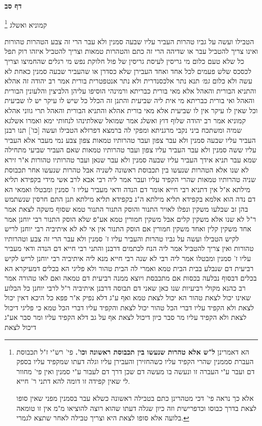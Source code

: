 \documentclass[12pt, openany]{book}
\newcommand{\sethebfont}{
\fontsize{10.5pt}{21.0pt} \selectfont
}
\newcommand{\twocol}[1]{
	{\sethebfont \begin{multicols}{2}
			#1
	\end{multicols}}	
}
\newcommand{\sectname}{}
\newcommand{\newsection}[1]{
	\addcontentsline{toc}{section}{#1}
	\renewcommand{\sectname}{#1}	
	\vspace{-\baselineskip}
	\begin{center}
		\textbf{%
\fontsize{16pt}{16pt}\selectfont
			#1}
	\end{center}
	\vspace{-\baselineskip}
	\nopagebreak
}
\newcommand{\footnotecomment}[1]{\footnote{#1}}
\newcommand{\commenta}[1]{\footnotecomment{#1}}
\begin{document}
\newsection{דף סב}
\twocol{קמוניא ואשלג
\commenta{הא דאמרינן \textbf{ל"ש אלא טהרות שנעשו בין תכבוסת ראשונה וכו'.}  פי' רש"י ז"ל תכבוסת העברת סממנין שהרי הקפיד עליו כשהחזירן והעבירן עליו וגלה דעתו שמקפיד עליו בספק דם ועבר ע"י העברה זו ונעשה בו מעשה דם שכן דרך דם לעבור ע"י סמנין ואין פי' מחוור לי שאין קפידה זו דומה להא דתני ר' חייא.\par  אלא כך נראה פי' דכי מטהרינן כתם בטבילה ראשונה כשלא עבר בסמנין מפני שאין סופו לצאת בדרך כבוסו וכדפרישית וזה כיון שגלה דעתו שהוא רוצה להוציאו מ"מ אין זו טומאה בלועה אלא סופו לצאת היא וצריך טבילה לאחר שתצא לגמרי. }

הטבילו ועשה על גביו טהרות העביר עליו שבעה סמנין ולא עבר הרי זה צבע הטהרות טהורות ואינו צריך להטביל  עבר או שדיהה הרי זה כתם והטהרות טמאות וצריך להטביל 
איזהו רוק תפל כל שלא טעם כלום  מי גריסין לעיסת גריסין של פול חלוקת נפש  מי רגלים שהחמיצו 
וצריך לכסכס שלש פעמים לכל אחד ואחד  העבירן שלא כסדרן או שהעביר שבעה סמנין כאחת לא עשה ולא כלום
{\large\emph{גמ׳}} תנא נתר אלכסנדרית ולא נתר אנטפטרית
בורית אמר רב יהודה  זה אהלא  והתניא  הבורית והאהל  אלא מאי בורית כבריתא 
ורמינהי  הוסיפו עליהן הלביצין והלעונין הבורית והאהל  ואי בורית כבריתא מי אית ליה שביעית  והתנן זה הכלל  כל שיש לו עיקר יש לו שביעית וכל שאין לו עיקר אין לו שביעית  אלא מאי בורית אהלא  והתניא  הבורית והאהל  תרי גווני אהלא
קמוניא אמר רב יהודה  שלוף דוץ ואשלג אמר שמואל  שאלתינהו לנחותי ימא ואמרו  אשלגא שמיה ומשתכח ביני נקבי מרגניתא ומפקי לה ברמצא דפרזלא
הטבילו ועשה [כו'] תנו רבנן  העביר עליו שבעה סמנין ולא עבר  צפון ועבר טהרותיו טמאות 
צפון צבע נמי מעבר  אלא  העביר עליו ששה סמנין ולא עבר העביר עליו צפון ועבר טהרותיו טמאות שאם העביר שביעי מתחילה שמא עבר 
תניא אידך  העביר עליו שבעה סמנין ולא עבר שנאן ועבר טהרותיו טהורות 
א"ר זירא  לא שנו אלא הטהרות שנעשו בין תכבוסת ראשונה לשניה אבל טהרות שנעשו אחר תכבוסת שניה טהרותיו טמאות שהרי הקפיד עליו ועבר
אמר ליה רבי אבא לרב אשי  מידי בקפידא תליא מילתא 
א"ל  אין דתניא רבי חייא אומר  דם הנדה ודאי מעביר עליו ז' סמנין ומבטלו
ואמאי  הא דם נדה הוא  אלמא בקפידא תליא מילתא ה"נ בקפידא תליא מילתא 
תנן התם  חרסין שנשתמש בהן זב שבלעו משקין ונפלו לאויר התנור והוסק התנור התנור טמא שסוף משקה לצאת 
אמר ר"ל  לא שנו אלא משקין קלים אבל משקין חמורין טמא אע"פ שלא הוסק התנור  רבי יוחנן אמר  אחד משקין קלין ואחד משקין חמורין אם הוסק התנור אין אי לא לא 
איתיביה רבי יוחנן לריש לקיש  הטבילו ועשה על גביו טהרות והעביר עליו ז' סמנין ולא עבר הרי זה צבע וטהרותיו טהורות ואין צריך להטביל 
אמר ליה  הנח לכתמים דרבנן 
והתני רבי חייא  דם הנדה ודאי מעביר עליו ז' סמנין ומבטלו 
אמר ליה  רבי לא שנה רבי חייא מנא ליה 
איתיביה רבי יוחנן לריש לקיש  רביעית דם שנבלע בבית הבית טמא  ואמרי לה  הבית טהור ולא פליגי הא בכלים דמעיקרא הא בכלים דבסוף 
נבלעה בכסות אם מתכבסת ויוצא ממנה רביעית דם טמאה ואם לאו טהורה 
אמר רב כהנא  מקולי רביעיות שנו כאן שאני דם תבוסה דרבנן 
איתיביה ר"ל לרבי יוחנן  כל הבלוע שאינו יכול לצאת טהור הא יכול לצאת טמא ואף ע"ג דלא נפיק 
א"ר פפא  כל היכא דאין יכול לצאת ולא הקפיד עליו דברי הכל טהור יכול לצאת והקפיד עליו דברי הכל טמא
כי פליגי דיכול לצאת ולא הקפיד עליו  מר סבר  כיון דיכול לצאת אף על גב דלא הקפיד עליו  ומר סבר  אע"ג דיכול לצאת}
\end{document}

